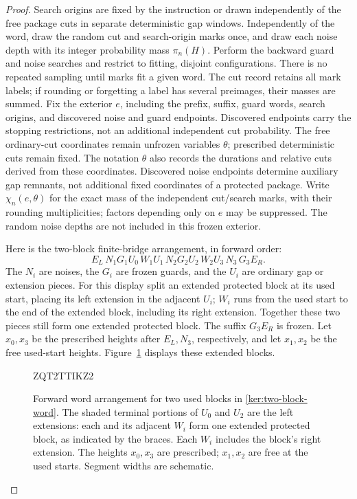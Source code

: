 \documentclass[11pt]{article}
\numberwithin{equation}{section}
\theoremstyle{definition}
\theoremstyle{remark}
\newcommand{\1}{\mathbf 1}
\begin{document}
\begin{proof}
Search origins are fixed by the instruction or drawn independently
of the free package cuts in separate deterministic gap windows.
Independently of the word, draw the random cut and search-origin marks once,
and draw each noise depth with its integer probability mass
\(\pi_n(H)\).  Perform the backward guard and noise searches and
restrict to fitting, disjoint configurations.  There is no repeated
sampling until marks fit a given word.  The cut record retains all
mark labels; if rounding or forgetting a label has several preimages,
their masses are summed.  Fix the exterior \(e\), including the
prefix, suffix, guard words, search origins, and discovered noise and
guard endpoints.  Discovered endpoints carry the stopping restrictions,
not an additional independent cut probability. The free ordinary-cut
coordinates remain unfrozen variables \(\theta\); prescribed
deterministic cuts remain fixed. The notation \(\theta\) also records
the durations and relative cuts derived from these coordinates.
Discovered noise endpoints determine auxiliary gap remnants, not
additional fixed coordinates of a protected package.
Write \(\chi_n(e,\theta)\) for the exact mass of the independent
cut/search marks, with their rounding multiplicities; factors depending
only on \(e\) may be suppressed.  The random noise depths are not
included in this frozen exterior.

Here is the two-block finite-bridge arrangement, in forward order:
\begin{equation}\label{ker:two-block-word}
 E_L\,N_1G_1U_0\,W_1U_1\,N_2G_2U_2\,W_2U_3\,N_3\,G_3E_R.
\end{equation}
The \(N_i\) are noises, the \(G_i\) are frozen guards, and the
\(U_i\) are ordinary gap or extension pieces.  For this display split
an extended protected block at its used start, placing its left
extension in the adjacent \(U_i\); \(W_i\) runs from the used start
to the end of the extended block, including its right extension.
Together these two pieces still form one extended protected block.
The suffix \(G_3E_R\) is frozen.
Let \(x_0,x_3\) be the prescribed heights after \(E_L,N_3\),
respectively, and let \(x_1,x_2\) be the free used-start heights.
Figure~\ref{ker:word-arrangement-figure} displays these extended blocks.

\begin{figure}[htbp]

ZQT2TTIKZ2

\caption{Forward word arrangement for two used blocks in
\eqref{ker:two-block-word}.  The shaded terminal portions of \(U_0\)
and \(U_2\) are the left extensions: each and its adjacent \(W_i\)
form one extended protected block, as indicated by the braces.
Each \(W_i\) includes the block's right extension.
The heights \(x_0,x_3\) are prescribed; \(x_1,x_2\) are free at the
used starts.  Segment widths are schematic.}
\label{ker:word-arrangement-figure}
\end{figure}


\end{proof}
\end{document}
